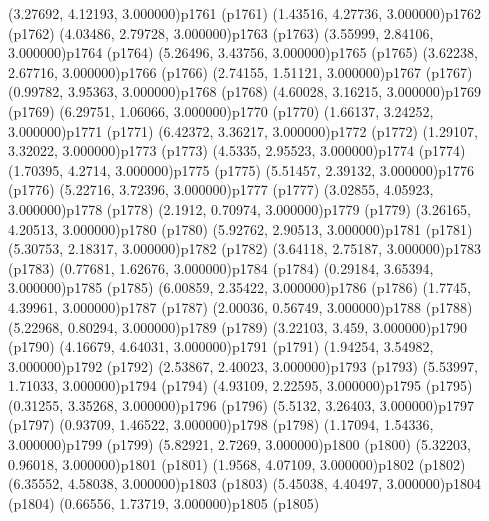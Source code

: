 \psPoint(3.27692, 4.12193, 3.000000){p1761}
\psdot(p1761)
\psPoint(1.43516, 4.27736, 3.000000){p1762}
\psdot(p1762)
\psPoint(4.03486, 2.79728, 3.000000){p1763}
\psdot(p1763)
\psPoint(3.55999, 2.84106, 3.000000){p1764}
\psdot(p1764)
\psPoint(5.26496, 3.43756, 3.000000){p1765}
\psdot(p1765)
\psPoint(3.62238, 2.67716, 3.000000){p1766}
\psdot(p1766)
\psPoint(2.74155, 1.51121, 3.000000){p1767}
\psdot(p1767)
\psPoint(0.99782, 3.95363, 3.000000){p1768}
\psdot(p1768)
\psPoint(4.60028, 3.16215, 3.000000){p1769}
\psdot(p1769)
\psPoint(6.29751, 1.06066, 3.000000){p1770}
\psdot(p1770)
\psPoint(1.66137, 3.24252, 3.000000){p1771}
\psdot(p1771)
\psPoint(6.42372, 3.36217, 3.000000){p1772}
\psdot(p1772)
\psPoint(1.29107, 3.32022, 3.000000){p1773}
\psdot(p1773)
\psPoint(4.5335, 2.95523, 3.000000){p1774}
\psdot(p1774)
\psPoint(1.70395, 4.2714, 3.000000){p1775}
\psdot(p1775)
\psPoint(5.51457, 2.39132, 3.000000){p1776}
\psdot(p1776)
\psPoint(5.22716, 3.72396, 3.000000){p1777}
\psdot(p1777)
\psPoint(3.02855, 4.05923, 3.000000){p1778}
\psdot(p1778)
\psPoint(2.1912, 0.70974, 3.000000){p1779}
\psdot(p1779)
\psPoint(3.26165, 4.20513, 3.000000){p1780}
\psdot(p1780)
\psPoint(5.92762, 2.90513, 3.000000){p1781}
\psdot(p1781)
\psPoint(5.30753, 2.18317, 3.000000){p1782}
\psdot(p1782)
\psPoint(3.64118, 2.75187, 3.000000){p1783}
\psdot(p1783)
\psPoint(0.77681, 1.62676, 3.000000){p1784}
\psdot(p1784)
\psPoint(0.29184, 3.65394, 3.000000){p1785}
\psdot(p1785)
\psPoint(6.00859, 2.35422, 3.000000){p1786}
\psdot(p1786)
\psPoint(1.7745, 4.39961, 3.000000){p1787}
\psdot(p1787)
\psPoint(2.00036, 0.56749, 3.000000){p1788}
\psdot(p1788)
\psPoint(5.22968, 0.80294, 3.000000){p1789}
\psdot(p1789)
\psPoint(3.22103, 3.459, 3.000000){p1790}
\psdot(p1790)
\psPoint(4.16679, 4.64031, 3.000000){p1791}
\psdot(p1791)
\psPoint(1.94254, 3.54982, 3.000000){p1792}
\psdot(p1792)
\psPoint(2.53867, 2.40023, 3.000000){p1793}
\psdot(p1793)
\psPoint(5.53997, 1.71033, 3.000000){p1794}
\psdot(p1794)
\psPoint(4.93109, 2.22595, 3.000000){p1795}
\psdot(p1795)
\psPoint(0.31255, 3.35268, 3.000000){p1796}
\psdot(p1796)
\psPoint(5.5132, 3.26403, 3.000000){p1797}
\psdot(p1797)
\psPoint(0.93709, 1.46522, 3.000000){p1798}
\psdot(p1798)
\psPoint(1.17094, 1.54336, 3.000000){p1799}
\psdot(p1799)
\psPoint(5.82921, 2.7269, 3.000000){p1800}
\psdot(p1800)
\psPoint(5.32203, 0.96018, 3.000000){p1801}
\psdot(p1801)
\psPoint(1.9568, 4.07109, 3.000000){p1802}
\psdot(p1802)
\psPoint(6.35552, 4.58038, 3.000000){p1803}
\psdot(p1803)
\psPoint(5.45038, 4.40497, 3.000000){p1804}
\psdot(p1804)
\psPoint(0.66556, 1.73719, 3.000000){p1805}
\psdot(p1805)
